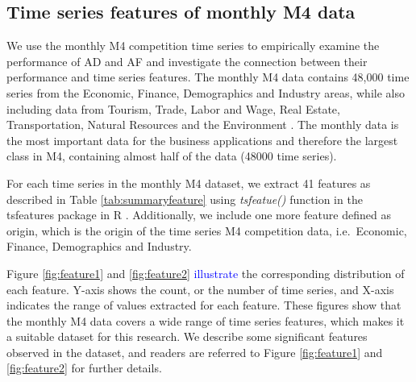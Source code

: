 \documentclass[preprint, 3p,
authoryear]{elsarticle} %
\begin{document}
\hypertarget{mtsmeasure}{%
\subsection{Time series features of monthly M4 data}\label{mtsmeasure}}

We use the monthly M4 competition time series to empirically examine the
performance of AD and AF and investigate the connection between their
performance and time series features. The monthly M4 data contains
48,000 time series from the Economic, Finance, Demographics and Industry
areas, while also including data from Tourism, Trade, Labor and Wage,
Real Estate, Transportation, Natural Resources and the Environment
\citep{Makridakis2018}. The monthly data is the most important data for
the business applications \citep{Spiliotis2020} and therefore the
largest class in M4, containing almost half of the data (48000 time
series).

For each time series in the monthly M4 dataset, we extract 41 features
as described in Table \ref{tab:summaryfeature} using \emph{tsfeatue()}
function in the tsfeatures package in R \citep{tsfeatures2020}.
Additionally, we include one more feature defined as origin, which is
the origin of the time series M4 competition data, i.e.~Economic,
Finance, Demographics and Industry.

Figure \ref{fig:feature1} and \ref{fig:feature2}
\textcolor{blue}{illustrate} the corresponding distribution of each
feature. Y-axis shows the count, or the number of time series, and
X-axis indicates the range of values extracted for each feature. These
figures show that the monthly M4 data covers a wide range of time series
features, which makes it a suitable dataset for this research. We
describe some significant features observed in the dataset, and readers
are referred to Figure \ref{fig:feature1} and \ref{fig:feature2} for
further details.
\end{document}
